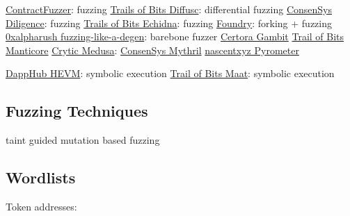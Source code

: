 \href{\urlcodecontractfuzzer}{ContractFuzzer}: fuzzing
\href{\urlcodediffusc}{Trails of Bits Diffusc}: differential fuzzing
\href{\urlwebdiligence}{ConsenSys Diligence}: fuzzing
\href{\urlcodeechidna}{Trails of Bits Echidna}: fuzzing
\href{\urlcodefoundry}{Foundry}: forking + fuzzing
\href{\urlcodefuzzinglikeadegen}{0xalpharush fuzzing-like-a-degen}: barebone fuzzer
\href{\urlcodegambit}{Certora Gambit}
\href{\urlcodemanticore}{Trail of Bits Manticore}
\href{\urlcodemedusa}{Crytic Medusa}:
\href{\urlcodemythril}{ConsenSys Mythril}
\href{\urlcodepyrometer}{nascentxyz Pyrometer}

\href{\urlcodehevm}{DappHub HEVM}: symbolic execution
\href{\urlcodemaat}{Trail of Bits Maat}: symbolic execution

\subsection{Fuzzing Techniques}

taint guided
mutation based fuzzing

\subsection{Wordlists}

Token addresses:

